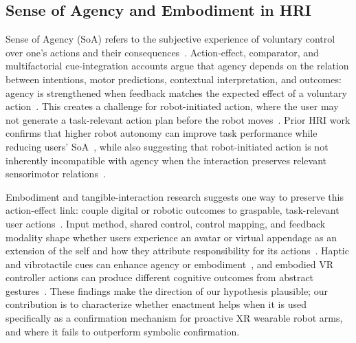 \documentclass[sigconf,review,anonymous]{acmart}
\begin{document}
\subsection{Sense of Agency and Embodiment in HRI}
\label{sec:Related SoASoE}
Sense of Agency (SoA) refers to the subjective experience of voluntary control over one's actions and their consequences~\cite{haggard2017sense, moore2016agency, 10.1145/3544548.3580651}. Action-effect, comparator, and multifactorial cue-integration accounts argue that agency depends on the relation between intentions, motor predictions, contextual interpretation, and outcomes: agency is strengthened when feedback matches the expected effect of a voluntary action~\cite{haggard2002voluntary, chambon2014intentions, synofzik2008beyond, s22249779, 10.1038/s41562-021-01233-2, app14167327}. This creates a challenge for robot-initiated action, where the user may not generate a task-relevant action plan before the robot moves~\cite{arXiv.2501.07462, yashin_robot_2024}. Prior HRI work confirms that higher robot autonomy can improve task performance while reducing users' SoA~\cite{10.5555/3721488.3721596}, while also suggesting that robot-initiated action is not inherently incompatible with agency when the interaction preserves relevant sensorimotor relations~\cite{s41598-020-59014-2}.

Embodiment and tangible-interaction research suggests one way to preserve this action-effect link: couple digital or robotic outcomes to graspable, task-relevant user actions~\cite{kilteni2012embodiment, synofzik2008imove, ishii1997tangible, 10.1145/3290605.3300673}. Input method, shared control, control mapping, and feedback modality shape whether users experience an avatar or virtual appendage as an extension of the self and how they attribute responsibility for its actions~\cite{li2025fingers, 10.1145/3411764.3445379, winkler_how_2020, 10.1145/3706598.3713586, 10.1145/3544548.3580979, 10.1145/3613904.3642518}. Haptic and vibrotactile cues can enhance agency or embodiment~\cite{10.1145/3613904.3642425, 10.1145/3613904.3642499}, and embodied VR controller actions can produce different cognitive outcomes from abstract gestures~\cite{10.1145/3489849.3489892}. These findings make the direction of our hypothesis plausible; our contribution is to characterize whether enactment helps when it is used specifically as a confirmation mechanism for proactive XR wearable robot arms, and where it fails to outperform symbolic confirmation.
\end{document}
